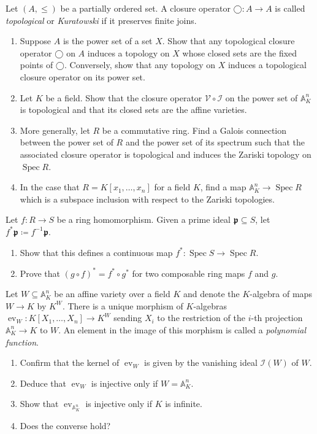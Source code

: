 \documentclass{exercises}
\DeclareMathOperator{\ev}{ev}
\DeclareMathOperator{\Spec}{Spec}
\begin{document}
\begin{exercise}
  Let $(A,≤)$ be a partially ordered set.
  A closure operator $◯:A → A$ is called \emph{topological} or \emph{Kuratowski} if it preserves finite joins.
  \begin{enumerate}
    \item Suppose $A$ is the power set of a set $X$.
      Show that any topological closure operator $◯$ on $A$ induces a topology on $X$ whose closed sets are the fixed points of $◯$.
      Conversely, show that any topology on $X$ induces a topological closure operator on its power set.
    \item Let $K$ be a field.
      Show that the closure operator $𝒱∘ℐ$ on the power set of $𝔸^n_K$ is topological and that its closed sets are the affine varieties.
    \item More generally, let $R$ be a commutative ring.
      Find a Galois connection between the power set of $R$ and the power set of its spectrum such that the associated closure operator is topological and induces the Zariski topology on $\Spec R$.
    \item In the case that $R=K[x_1,\dots,x_n]$ for a field $K$, find a map $𝔸^n_K → \Spec R$ which is a subspace inclusion with respect to the Zariski topologies.
  \end{enumerate}
\end{exercise}

\begin{exercise}
  Let $f:R → S$ be a ring homomorphism.
  Given a prime ideal $𝖕⊆S$, let $f^*𝖕 \coloneqq f^{-1}𝖕$.
  \begin{enumerate}
    \item Show that this defines a continuous map $f^*:\Spec S → \Spec R$.
    \item Prove that $(g∘f)^*=f^*∘g^*$ for two composable ring maps $f$ and $g$.
  \end{enumerate}
\end{exercise}

\begin{exercise}
  Let $W⊆𝔸^n_K$ be an affine variety over a field $K$ and denote the $K$-algebra of maps $W → K$ by $K^W$.
  There is  a unique morphism of $K$-algebras $\ev_W:K[X_1,\dots,X_n] → K^W$ sending $X_i$ to the restriction of the $i$-th projection $𝔸^n_K → K$ to $W$.
  An element in the image of this morphism is called a \emph{polynomial function}.
  \begin{enumerate}
    \item Confirm that the kernel of $\ev_W$ is given by the vanishing ideal $ℐ(W)$ of $W$.
    \item Deduce that $\ev_W$ is injective only if $W=𝔸^n_K$.
    \item Show that $\ev_{𝔸^n_K}$ is injective only if $K$ is infinite.
    \item Does the converse hold?
  \end{enumerate}
\end{exercise}
\end{document}
